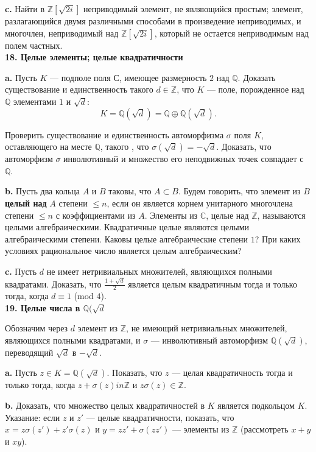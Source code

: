 \textbf{c.} Найти в $\mathbb{Z}[\sqrt{2i}]$ неприводимый элемент, не являющийся простым; элемент, разлагающийся двумя различными способами в произведение неприводимых, и многочлен, неприводимый над $\mathbb{Z}[\sqrt{2i}]$, который не остается неприводимым над полем частных.
\\

\noindent \textbf{18. Целые элементы; целые квадратичности}

\textbf{a.} Пусть $K$ — подполе поля $\mathbb{С}$, имеющее размерность $2$ над $\mathbb{Q}$. Доказать существование и единственность такого $d \in \mathbb{Z}$, что $K$ — поле,
порожденное над $\mathbb{Q}$ элементами $1$ и $\sqrt{d}$:
\[
K = \mathbb{Q}(\sqrt{d}) = \mathbb{Q} \oplus \mathbb{Q}(\sqrt{d}).
\]

\noindent Проверить существование и единственность автоморфизма $\sigma$ поля $K$,
оставляющего на месте $\mathbb{Q}$, такого , что $\sigma (\sqrt{d}) = -\sqrt{d}$. Доказать, что автоморфизм $\sigma$ инволютивный и множество его неподвижных точек совпадает с $\mathbb{Q}$.

\textbf{b.} Пусть два кольца $A$ и $B$ таковы, что $A \subset B$. Будем говорить, что элемент из $B$ \textbf{целый над} $A$ степени $\le n$, если он является корнем унитарного многочлена степени $\le n$ с коэффициентами из $A$. Элементы из $\mathbb{C}$, целые над $\mathbb{Z}$, называются целыми алгебраическими. Квадратичные целые являются целыми алгебраическими степени. Каковы целые алгебраические степени $1$? При каких условиях рациональное число является целым алгебраическим?

\textbf{c.} Пусть $d$ не имеет нетривиальных множителей, являющихся полными квадратами. Доказать, что $\frac{1+\sqrt{d}}{2}$ является целым 
квадратичным тогда и только тогда, когда $d \equiv 1$ (mod $4$).
\\

\noindent \textbf{19. Целые числа в $\mathbb{Q}(\sqrt{d}$}

Обозначим через $d$ элемент из $\mathbb{Z}$, не имеющий нетривиальных 
множителей, являющихся полными квадратами, и $\sigma$ — инволютивный 
автоморфизм $\mathbb{Q}(\sqrt{d})$, переводящий $\sqrt{d}$ в $- \sqrt{d}$.

\textbf{a.} Пусть $z \in K = \mathbb{Q}(\sqrt{d})$. Показать, что $z$ — целая квадратичность тогда и только тогда, когда $z+\sigma (z)in \mathbb{Z}$ и $z\sigma (z) \in \mathbb{Z}$.

\textbf{b.} Доказать, что множество целых квадратичностей в $K$ 
является подкольцом $K$. Указание: если $z$ и $z'$ — целые квадратичности, 
показать, что $x=z\sigma(z')+z'\sigma(z)$ и $y=zz'+\sigma(zz')$ — элементы из $\mathbb{Z}$ (рассмотреть $x + y$ и $xy$).

